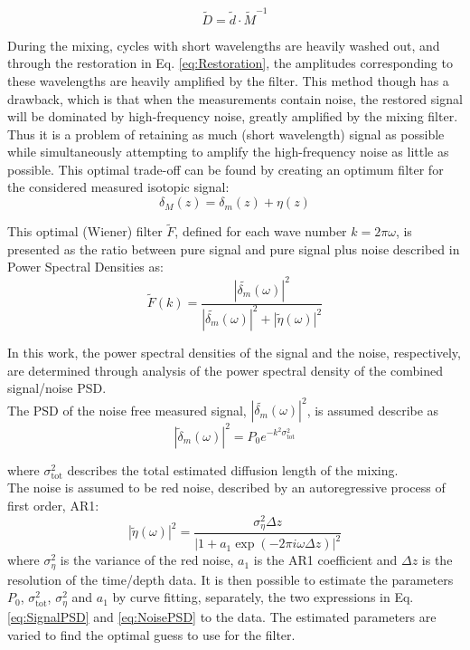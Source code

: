 \documentclass[../../CompleteThesis2/Complete_2ndDraft]{subfiles}
\begin{document}
\begin{equation}
	\tilde{D} = \tilde{d}\cdot\tilde{M}^{-1}
	\label{eq:Restoration}
\end{equation}

During the mixing, cycles with short wavelengths are heavily washed out, and through the restoration in Eq. \ref{eq:Restoration}, the amplitudes corresponding to these wavelengths are heavily amplified by the filter. This method though has a drawback, which is that when the measurements contain noise, the restored signal will be dominated by high-frequency noise, greatly amplified by the mixing filter. Thus it is a problem of retaining as much (short wavelength) signal as possible while simultaneously attempting to amplify the high-frequency noise as little as possible. This optimal trade-off can be found by creating an optimum filter for the considered measured isotopic signal:
\begin{equation}
	\delta_M(z) = \delta_m (z) + \eta(z)
\end{equation} 

This optimal (Wiener) filter $\tilde{F}$, defined for each wave number $k = 2\pi \omega$, is presented as the ratio between pure signal and pure signal plus noise described in Power Spectral Densities as:
\begin{equation}
	\tilde{F}(k) =\frac{|\tilde{\delta_m}(\omega)|^2}{|\tilde{\delta_m}(\omega)|^2 + |\tilde{\eta}(\omega)|^2}
	\label{eq:WienerFilter}
\end{equation}

In this work, the power spectral densities of the signal and the noise, respectively, are determined through analysis of the power spectral density of the combined signal/noise PSD.\\
The PSD of the noise free measured signal, $|\tilde{\delta_m}(\omega)|^2$, is assumed describe as 
\begin{equation}
	|\tilde{\delta}_m(\omega)|^2 = P_0 e^{-k^2 \sigma_{\text{tot}}^2}
	\label{eq:SignalPSD}
\end{equation}

where $\sigma_{\text{tot}}^2$ describes the total estimated diffusion length of the mixing.\\
The noise is assumed to be red noise, described by an autoregressive process of first order, AR1:
\begin{equation}
	|\tilde{\eta}(\omega)|^2 = \frac{\sigma_{\eta}^2 \Delta z}{|1 + a_1 \exp(-2\pi i \omega \Delta z)|^2}
	\label{eq:NoisePSD}
\end{equation}
where $\sigma_{\eta}^2$ is the variance of the red noise, $a_1$ is the AR1 coefficient and $\Delta z$ is the resolution of the time/depth data.
It is then possible to estimate the parameters $P_0$, $\sigma_{\text{tot}}^2$, $\sigma_{\eta}^2$ and $a_1$ by curve fitting, separately, the two expressions in Eq. \ref{eq:SignalPSD} and \ref{eq:NoisePSD} to the data. The estimated parameters are varied to find the optimal guess to use for the filter.
\end{document}
